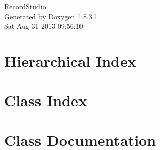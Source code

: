 \documentclass{book}
\begin{document}
\hypersetup{pageanchor=false,citecolor=blue}
\begin{titlepage}
\vspace*{7cm}
\begin{center}
{\Large Record\-Studio }\\
\vspace*{1cm}
{\large Generated by Doxygen 1.8.3.1}\\
\vspace*{0.5cm}
{\small Sat Aug 31 2013 09:56:10}\\
\end{center}
\end{titlepage}
\clearemptydoublepage
{}
\tableofcontents
\clearemptydoublepage
{}
\hypersetup{pageanchor=true,citecolor=blue}
\chapter{Hierarchical Index}

\chapter{Class Index}

\chapter{Class Documentation}































\printindex
\end{document}
